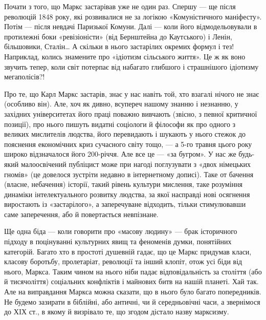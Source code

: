 
Почати з того, що Маркс застарівав уже не один раз. Спершу — ще після 
революцій 1848 року, які розвивалися не за логікою «Комуністичного 
маніфесту». Потім — після невдачі Паризької Комуни. Далі — коли його 
відмодельовували в протилежні боки «ревізіоністи» (від Бернштейна до 
Каутського) і Ленін, більшовики, Сталін\ldots{} А скільки в нього 
застарілих окремих формул і тез! Наприклад, колись знамените про 
«ідіотизм сільського життя». Це ж як воно звучить тепер, коли світ 
потерпає від набагато глибшого і страшнішого ідіотизму мегаполісів?!


Про те, що Карл Маркс застарів, знає у нас навіть той, хто взагалі 
нічого не знає (особливо він). Але, хоч як дивно, всупереч нашому знанню 
і незнанню, у західних університетах його праці поважно вивчають 
(звісно, з певної критичної позиції), про нього пишуть видатні 
соціологи й філософи як про одного з великих мислителів людства, його 
перевидають і шукають у нього стежок до пояснення економічних криз 
сучасного світу тощо, — а 5-го травня цього року широко відзначалося 
його 200-річчя. Але все це — «за бугром». У нас же будь-який 
малоосвічений публіцист може при нагоді поглузувати з «двох 
німецьких гномів» (це довелося зустріти недавно в інтернетному 
дописі). Таке от бачення (власне, небачення) історії, такий рівень 
культури мислення, таке розуміння динаміки інтелектуального розвитку 
людства, за якої насправді нові осягнення виростають із 
«застарілого», а заперечуване відходить, тільки стимулювавши саме 
заперечення, або й повертається невпізнане.


Ще одна біда — коли говорити про «масову людину» — брак історичного 
підходу в поцінуванні культурних явищ та феноменів думки, понятійних 
категорій. Багато хто в простоті душевній гадає, що це Маркс придумав 
класи, класову боротьбу, пролетаріат, революції та інший клопіт, отож 
усі біди від нього, Маркса. Таким чином на нього ніби падає 
відповідальність за століття (або й тисячоліття) соціальних 
конфліктів і майнових битв на нашій планеті. Хай так. Але на 
виправдання Маркса можна сказати, що в нього було багато попередників. 
Не будемо зазирати в біблійні, або античні, чи й середньовічні часи, а 
звернімося до ХIХ ст., в якому й визрівало те, що згодом дістало назву 
марксизму.


